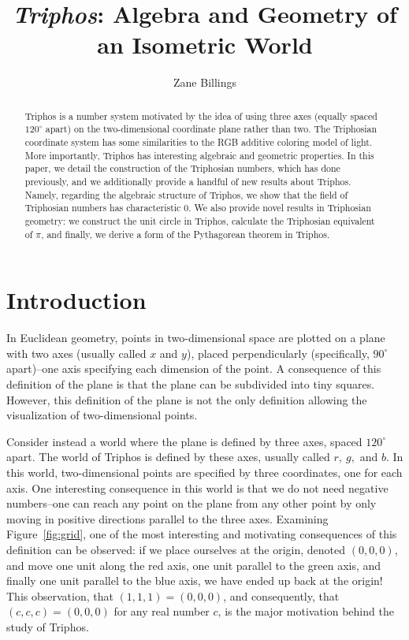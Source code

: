 \documentclass[11pt]{article}
\title{\textit{Triphos}: Algebra and Geometry of an Isometric World}
\author{Zane Billings}
\date{}
\newcommand{\degr}{^{\circ}}
\theoremstyle{definition}
\theoremstyle{plain}
\theoremstyle{remark}
\begin{document}
	\maketitle
	\begin{abstract}
		Triphos is a number system motivated by the idea of using three axes
		(equally spaced \(120^{\circ}\) apart) on the two-dimensional
		coordinate plane rather than two. The Triphosian coordinate system has
		some similarities to the RGB additive coloring model of light. More
		importantly, Triphos has interesting algebraic and geometric
		properties. In this paper, we detail the construction of the Triphosian
		numbers, which has done previously, and we additionally provide a
		handful of new results about Triphos. Namely, regarding the algebraic
		structure of Triphos, we show that the field of Triphosian numbers has
		characteristic 0. We also provide novel results in Triphosian geometry:
		we construct the unit circle in Triphos, calculate the Triphosian
		equivalent of \(\pi\), and finally, we derive a form of the Pythagorean
		theorem in Triphos.
	\end{abstract}

	\section{Introduction}

	In Euclidean geometry, points in two-dimensional space are plotted on a
	plane with two axes (usually called \(x\) and \(y\)), placed
	perpendicularly (specifically, \(90\degr\) apart)--one axis specifying each
	dimension of the point. A consequence of this definition of the plane is
	that the plane can be subdivided into tiny squares. However, this
	definition of the plane is not the only definition allowing the
	visualization of two-dimensional points.

	Consider instead a world where the plane is defined by three axes, spaced
	\(120\degr\) apart. The world of Triphos is defined by these axes, usually
	called \(r, \ g,\) and \(b\). In this world, two-dimensional points are
	specified by three coordinates, one for each axis. One interesting
	consequence in this world is that we do not need negative numbers--one can
	reach any point on the plane from any other point by only moving in
	positive directions parallel to the three axes. Examining
	Figure~\ref{fig:grid}, one of the most interesting and motivating
	consequences of this definition can be observed: if we place ourselves at
	the origin, denoted \((0,0,0)\), and move one unit along the red axis, one
	unit parallel to the green axis, and finally one unit parallel to the blue
	axis, we have ended up back at the origin! This observation, that \((1,1,1)
	= (0,0,0)\), and consequently, that \((c,c,c) = (0,0,0)\) for any real
	number \(c\), is the major motivation behind the study of Triphos.
\end{document}
